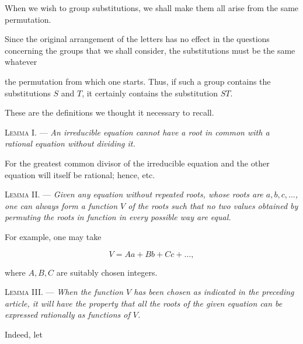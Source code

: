 When we wish to group substitutions, we shall make them all arise from the same
permutation.

Since the original arrangement of the letters has no effect in the questions
concerning the groups that we shall consider, the substitutions must be the
same whatever


the permutation from which one starts. Thus, if such a group contains the
substitutions $S$ and $T$, it certainly contains the substitution $ST$.

These are the definitions we thought it necessary to recall.

\medskip
\noindent\textsc{Lemma I.} --- \emph{An irreducible equation cannot have a root in
common with a rational equation without dividing it.}

For the greatest common divisor of the irreducible equation and the other
equation will itself be rational; hence, etc.

\medskip
\noindent\textsc{Lemma II.} --- \emph{Given any equation without repeated roots,
whose roots are $a,b,c,\ldots$, one can always form a function $V$ of the roots
such that no two values obtained by permuting the roots in
 function in every possible way are equal.}

For example, one may take

\[
V=Aa+Bb+Cc+\ldots,
\]

where $A,B,C$ are suitably chosen integers.


\medskip
\noindent\textsc{Lemma III.} --- \emph{When the function $V$ has been chosen as
indicated in the preceding article, it will have the property that all the
roots of the given equation can be expressed rationally as functions of $V$.}

Indeed, let

